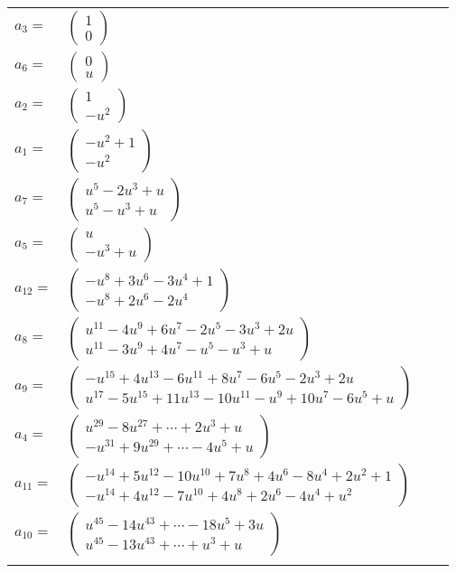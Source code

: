 \documentclass[1p]{elsarticle_modified}
\theoremstyle{definition}
\begin{document}
\begin{tabular}{m{7pt} m{180pt} m{7pt} m{180pt} }
\flushright $a_{3}=$&$\begin{pmatrix}1\\0\end{pmatrix}$ \\
\flushright $a_{6}=$&$\begin{pmatrix}0\\u\end{pmatrix}$ \\
\flushright $a_{2}=$&$\begin{pmatrix}1\\- u^2\end{pmatrix}$ \\
\flushright $a_{1}=$&$\begin{pmatrix}- u^2+1\\- u^2\end{pmatrix}$ \\
\flushright $a_{7}=$&$\begin{pmatrix}u^5-2 u^3+u\\u^5- u^3+u\end{pmatrix}$ \\
\flushright $a_{5}=$&$\begin{pmatrix}u\\- u^3+u\end{pmatrix}$ \\
\flushright $a_{12}=$&$\begin{pmatrix}- u^8+3 u^6-3 u^4+1\\- u^8+2 u^6-2 u^4\end{pmatrix}$ \\
\flushright $a_{8}=$&$\begin{pmatrix}u^{11}-4 u^9+6 u^7-2 u^5-3 u^3+2 u\\u^{11}-3 u^9+4 u^7- u^5- u^3+u\end{pmatrix}$ \\
\flushright $a_{9}=$&$\begin{pmatrix}- u^{15}+4 u^{13}-6 u^{11}+8 u^7-6 u^5-2 u^3+2 u\\u^{17}-5 u^{15}+11 u^{13}-10 u^{11}- u^9+10 u^7-6 u^5+u\end{pmatrix}$ \\
\flushright $a_{4}=$&$\begin{pmatrix}u^{29}-8 u^{27}+\cdots+2 u^3+u\\- u^{31}+9 u^{29}+\cdots-4 u^5+u\end{pmatrix}$ \\
\flushright $a_{11}=$&$\begin{pmatrix}- u^{14}+5 u^{12}-10 u^{10}+7 u^8+4 u^6-8 u^4+2 u^2+1\\- u^{14}+4 u^{12}-7 u^{10}+4 u^8+2 u^6-4 u^4+u^2\end{pmatrix}$ \\
\flushright $a_{10}=$&$\begin{pmatrix}u^{45}-14 u^{43}+\cdots-18 u^5+3 u\\u^{45}-13 u^{43}+\cdots+u^3+u\end{pmatrix}$\\&\end{tabular}
\end{document}
